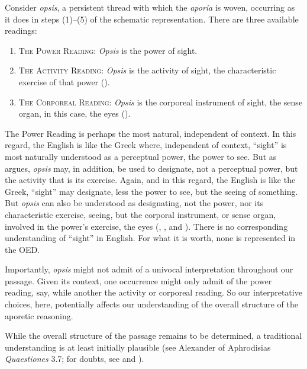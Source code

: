 Consider \emph{opsis}, a persistent thread with which the \emph{aporia} is woven, occurring as it does in steps (1)–(5) of the schematic representation. There are three available readings:
\begin{enumerate}[(1)]
	\item \textsc{The Power Reading}: \emph{Opsis} is the power of sight.
	\item \textsc{The Activity Reading}: \emph{Opsis} is the activity of sight, the characteristic exercise of that power (\citealt{caston02}).
	\item \textsc{The Corporeal Reading}: \emph{Opsis} is the corporeal instrument of sight, the sense organ, in this case, the eyes (\citealt{Trubowitz:2025aa}).
\end{enumerate}
The Power Reading is perhaps the most natural, independent of context. In this regard, the English is like the Greek where, independent of context, ``sight'' is most naturally understood as a perceptual power, the power to see. But as \citet{caston02} argues, \emph{opsis} may, in addition, be used to designate, not a perceptual power, but the activity that is its exercise. Again, and in this regard, the English is like the Greek, ``sight'' may designate, less the power to see, but the seeing of something. But \emph{opsis} can also be understood as designating, not the power, nor its characteristic exercise, seeing, but the corporal instrument, or sense organ, involved in the power's exercise, the eyes (\citealt[]{Bonitz:1870aa}, \citealt[]{Hicks:1907uq}, and \citealt{Trubowitz:2025aa}). There is no corresponding understanding of ``sight'' in English. For what it is worth, none is represented in the OED.

Importantly, \emph{opsis} might not admit of a univocal interpretation throughout our passage. Given its context, one occurrence might only admit of the power reading, say, while another the activity or corporeal reading. So our interpretative choices, here, potentially affects our understanding of the overall structure of the aporetic reasoning.

While the overall structure of the passage remains to be determined, a traditional understanding is at least initially plausible (see Alexander of Aphrodisias \emph{Quaestiones} 3.7; for doubts, see \citealt{Kosman:2014ab} and \citealt{Osborne:1983le}).


